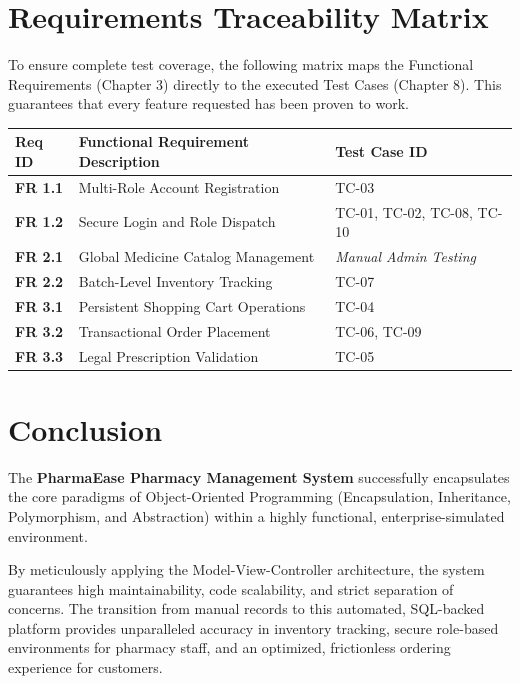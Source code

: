 \documentclass[12pt,a4paper]{report}
\begin{document}
\chapter{Requirements Traceability Matrix}

To ensure complete test coverage, the following matrix maps the Functional Requirements (Chapter 3) directly to the executed Test Cases (Chapter 8). This guarantees that every feature requested has been proven to work.

\begin{longtable}{>{\bfseries}p{2.5cm} p{8cm} p{3.5cm}}
\toprule
\rowcolor{headerBlue}\color{white}\textbf{Req ID} & \color{white}\textbf{Functional Requirement Description} & \color{white}\textbf{Test Case ID} \\
\midrule
\endfirsthead
\rowcolor{rowOdd} FR 1.1 & Multi-Role Account Registration & TC-03 \\
FR 1.2 & Secure Login and Role Dispatch & TC-01, TC-02, TC-08, TC-10 \\
\rowcolor{rowOdd} FR 2.1 & Global Medicine Catalog Management & \textit{Manual Admin Testing} \\
FR 2.2 & Batch-Level Inventory Tracking & TC-07 \\
\rowcolor{rowOdd} FR 3.1 & Persistent Shopping Cart Operations & TC-04 \\
FR 3.2 & Transactional Order Placement & TC-06, TC-09 \\
\rowcolor{rowOdd} FR 3.3 & Legal Prescription Validation & TC-05 \\
\bottomrule
\end{longtable}

\clearpage

\chapter{Conclusion}

The \textbf{PharmaEase Pharmacy Management System} successfully encapsulates the core paradigms of Object-Oriented Programming (Encapsulation, Inheritance, Polymorphism, and Abstraction) within a highly functional, enterprise-simulated environment. 

By meticulously applying the Model-View-Controller architecture, the system guarantees high maintainability, code scalability, and strict separation of concerns. The transition from manual records to this automated, SQL-backed platform provides unparalleled accuracy in inventory tracking, secure role-based environments for pharmacy staff, and an optimized, frictionless ordering experience for customers.
\end{document}
